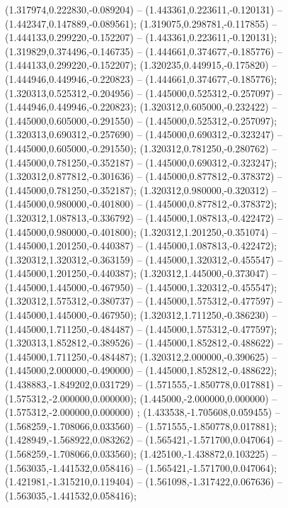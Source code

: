  (1.317974,0.222830,-0.089204) -- (1.443361,0.223611,-0.120131) -- (1.442347,0.147889,-0.089561);
 (1.319075,0.298781,-0.117855) -- (1.444133,0.299220,-0.152207) -- (1.443361,0.223611,-0.120131);
 (1.319829,0.374496,-0.146735) -- (1.444661,0.374677,-0.185776) -- (1.444133,0.299220,-0.152207);
 (1.320235,0.449915,-0.175820) -- (1.444946,0.449946,-0.220823) -- (1.444661,0.374677,-0.185776);
 (1.320313,0.525312,-0.204956) -- (1.445000,0.525312,-0.257097) -- (1.444946,0.449946,-0.220823);
 (1.320312,0.605000,-0.232422) -- (1.445000,0.605000,-0.291550) -- (1.445000,0.525312,-0.257097);
 (1.320313,0.690312,-0.257690) -- (1.445000,0.690312,-0.323247) -- (1.445000,0.605000,-0.291550);
 (1.320312,0.781250,-0.280762) -- (1.445000,0.781250,-0.352187) -- (1.445000,0.690312,-0.323247);
 (1.320312,0.877812,-0.301636) -- (1.445000,0.877812,-0.378372) -- (1.445000,0.781250,-0.352187);
 (1.320312,0.980000,-0.320312) -- (1.445000,0.980000,-0.401800) -- (1.445000,0.877812,-0.378372);
 (1.320312,1.087813,-0.336792) -- (1.445000,1.087813,-0.422472) -- (1.445000,0.980000,-0.401800);
 (1.320312,1.201250,-0.351074) -- (1.445000,1.201250,-0.440387) -- (1.445000,1.087813,-0.422472);
 (1.320312,1.320312,-0.363159) -- (1.445000,1.320312,-0.455547) -- (1.445000,1.201250,-0.440387);
 (1.320312,1.445000,-0.373047) -- (1.445000,1.445000,-0.467950) -- (1.445000,1.320312,-0.455547);
 (1.320312,1.575312,-0.380737) -- (1.445000,1.575312,-0.477597) -- (1.445000,1.445000,-0.467950);
 (1.320312,1.711250,-0.386230) -- (1.445000,1.711250,-0.484487) -- (1.445000,1.575312,-0.477597);
 (1.320313,1.852812,-0.389526) -- (1.445000,1.852812,-0.488622) -- (1.445000,1.711250,-0.484487);
 (1.320312,2.000000,-0.390625) -- (1.445000,2.000000,-0.490000) -- (1.445000,1.852812,-0.488622);
 (1.438883,-1.849202,0.031729) -- (1.571555,-1.850778,0.017881) -- (1.575312,-2.000000,0.000000);
 (1.445000,-2.000000,0.000000) -- (1.575312,-2.000000,0.000000) ;
 (1.433538,-1.705608,0.059455) -- (1.568259,-1.708066,0.033560) -- (1.571555,-1.850778,0.017881);
 (1.428949,-1.568922,0.083262) -- (1.565421,-1.571700,0.047064) -- (1.568259,-1.708066,0.033560);
 (1.425100,-1.438872,0.103225) -- (1.563035,-1.441532,0.058416) -- (1.565421,-1.571700,0.047064);
 (1.421981,-1.315210,0.119404) -- (1.561098,-1.317422,0.067636) -- (1.563035,-1.441532,0.058416);

